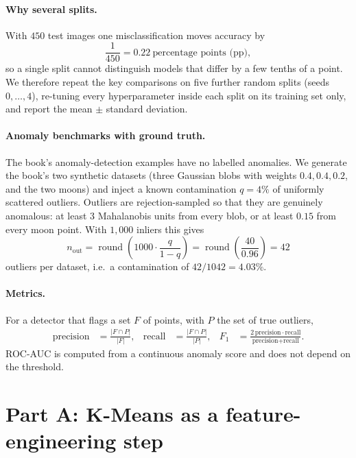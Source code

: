 \documentclass[11pt,a4paper]{article}
\begin{document}
\paragraph{Why several splits.} With $450$ test images one misclassification moves accuracy by
\begin{equation}
  \frac{1}{450} = 0.22\ \text{percentage points (pp)},
\end{equation}
so a single split cannot distinguish models that differ by a few tenths of a point. We therefore repeat the key
comparisons on five further random splits (seeds $0,\dots,4$), re-tuning every hyperparameter inside each split on
its training set only, and report the mean $\pm$ standard deviation.

\paragraph{Anomaly benchmarks with ground truth.} The book's anomaly-detection examples have no labelled
anomalies. We generate the book's two synthetic datasets (three Gaussian blobs with weights $0.4,0.4,0.2$, and the
two moons) and inject a known contamination $q=4\%$ of uniformly scattered outliers. Outliers are rejection-sampled
so that they are genuinely anomalous: at least $3$ Mahalanobis units from every blob, or at least $0.15$ from every
moon point. With $1{,}000$ inliers this gives
\begin{equation}
  n_{\text{out}} = \operatorname{round}\!\left(1000\cdot\frac{q}{1-q}\right)
  = \operatorname{round}\!\left(\frac{40}{0.96}\right) = 42
\end{equation}
outliers per dataset, i.e.\ a contamination of $42/1042 = 4.03\%$.

\paragraph{Metrics.} For a detector that flags a set $F$ of points, with $P$ the set of true outliers,
\begin{align}
  \text{precision} &= \frac{|F\cap P|}{|F|}, &
  \text{recall} &= \frac{|F\cap P|}{|P|}, &
  F_1 &= \frac{2\,\text{precision}\cdot\text{recall}}{\text{precision}+\text{recall}}.
\end{align}
ROC-AUC is computed from a continuous anomaly score and does not depend on the threshold.

\section{Part A: K-Means as a feature-engineering step}
\end{document}
